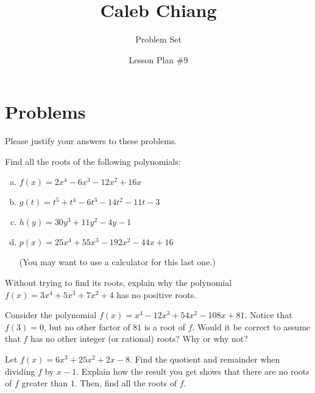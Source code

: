 \documentclass[11pt]{scrarticle}
\title{Caleb Chiang}
\author{Problem Set}
\date{Lesson Plan \#9}
\begin{document}
\section{Problems}

Please justify your answers to these problems.

\begin{exercise}
    Find all the roots of the following polynomials:
    \begin{enumerate}[(a)]
        \item $f(x) = 2x^4-6x^3-12x^2+16x$
        \item $g(t) = t^5+t^4-6t^3-14t^2-11t-3$
        \item $h(y) = 30y^3+11y^2-4y-1$
        \item $p(x) = 25x^4+55x^3-192x^2-44x+16$ 
        
        (You may want to use a calculator for this last one.)
    \end{enumerate}
\end{exercise}

\begin{exercise}
    Without trying to find its roots, explain why the polynomial $f(x) = 3x^4 + 5x^3 + 7x^2 + 4$ has no positive roots.
\end{exercise}

\begin{exercise}
    Consider the polynomial $f(x) = x^4 - 12x^3 + 54x^2 - 108x + 81$. Notice that $f(3) = 0$, but no other factor of $81$ is a root of $f$. Would it be correct to assume that $f$ has no other integer (or rational) roots? Why or why not?
\end{exercise}

\begin{exercise}
    Let $f(x) = 6x^3+25x^2+2x-8$. Find the quotient and remainder when dividing $f$ by $x-1$. Explain how the result you get shows that there are no roots of $f$ greater than $1$. Then, find all the roots of $f$.
\end{exercise}
\end{document}
